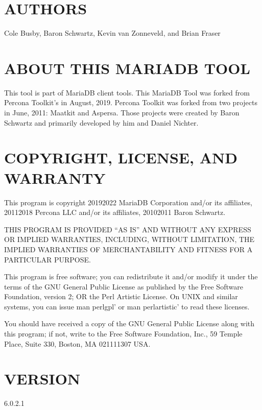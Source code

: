 \documentclass[letterpaper,10pt,english]{sphinxmanual}
\begin{document}
\section{AUTHORS}
\label{\detokenize{mariadb-system-summary:authors}}
Cole Busby, Baron Schwartz, Kevin van Zonneveld, and Brian Fraser


\section{ABOUT THIS MARIADB TOOL}
\label{\detokenize{mariadb-system-summary:about-this-mariadb-tool}}
This tool is part of MariaDB client tools. This MariaDB Tool was forked from
Percona Toolkit’s  in August, 2019. Percona Toolkit was
forked from two projects in June, 2011: Maatkit and Aspersa.  Those projects
were created by Baron Schwartz and primarily developed by him and Daniel Nichter.


\section{COPYRIGHT, LICENSE, AND WARRANTY}
\label{\detokenize{mariadb-system-summary:copyright-license-and-warranty}}
This program is copyright 2019\sphinxhyphen{}2022 MariaDB Corporation and/or its affiliates,
2011\sphinxhyphen{}2018 Percona LLC and/or its affiliates, 2010\sphinxhyphen{}2011 Baron Schwartz.

THIS PROGRAM IS PROVIDED “AS IS” AND WITHOUT ANY EXPRESS OR IMPLIED
WARRANTIES, INCLUDING, WITHOUT LIMITATION, THE IMPLIED WARRANTIES OF
MERCHANTABILITY AND FITNESS FOR A PARTICULAR PURPOSE.

This program is free software; you can redistribute it and/or modify it under
the terms of the GNU General Public License as published by the Free Software
Foundation, version 2; OR the Perl Artistic License.  On UNIX and similar
systems, you can issue \textasciigrave{}man perlgpl’ or \textasciigrave{}man perlartistic’ to read these
licenses.

You should have received a copy of the GNU General Public License along with
this program; if not, write to the Free Software Foundation, Inc., 59 Temple
Place, Suite 330, Boston, MA  02111\sphinxhyphen{}1307  USA.


\section{VERSION}
\label{\detokenize{mariadb-system-summary:version}}
 6.0.2.1
\end{document}
